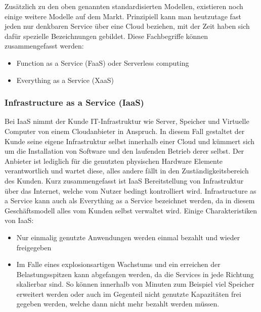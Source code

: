 Zusätzlich zu den oben genannten standardisierten Modellen, existieren noch einige weitere Modelle auf dem Markt. Prinzipiell
kann man heutzutage fast jeden nur denkbaren Service über eine Cloud beziehen, mit der Zeit haben sich dafür spezielle Bezeichnungen gebildet. Diese Fachbegriffe können zusammengefasst werden:
\begin{itemize}
	\item Function as a Service (FaaS) oder Serverless computing
	\item Everything as a Service (XaaS)

\end{itemize}


\subsubsection{Infrastructure as  a Service (IaaS)}
Bei IaaS nimmt der Kunde IT-Infrastruktur wie Server, Speicher und Virtuelle Computer von einem Cloudanbieter in Anspruch. In diesem Fall gestaltet der Kunde seine eigene Infrastruktur selbst innerhalb einer Cloud und kümmert sich um die Installation von Software und den laufenden Betrieb derer selbst. Der Anbieter ist lediglich für die genutzten physischen Hardware Elemente verantwortlich und wartet diese, alles andere fällt in den Zuständigkeitsbereich des Kunden. Kurz zusammengefasst ist IaaS Bereitstellung von Infrastruktur über das Internet, welche vom Nutzer bedingt kontrolliert wird. \newline
Infrastructure as a Service kann auch als Everything as a Service bezeichnet werden, da in diesem Geschäftsmodell alles vom Kunden selbst verwaltet wird. Einige Charakteristiken von IaaS:
\begin{itemize}
	\item Nur einmalig genutzte Anwendungen werden einmal bezahlt und wieder freigegeben
	\item Im Falle eines explosionsartigen Wachstums und ein erreichen der Belastungsspitzen kann abgefangen werden, da die Services in jede Richtung skalierbar sind. So können innerhalb von Minuten zum Beispiel viel Speicher erweitert werden oder auch im Gegenteil nicht genutzte Kapazitäten frei gegeben werden, welche dann nicht mehr bezahlt werden müssen.
\end{itemize}

